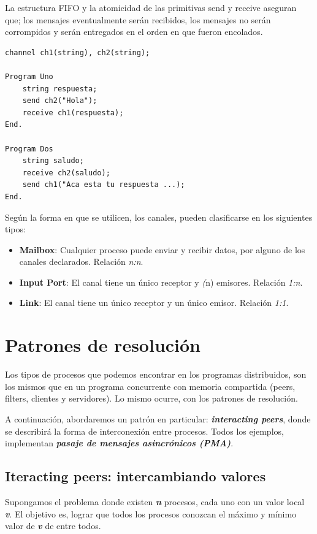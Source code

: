 \documentclass[a4paper, 10pt]{report}
\begin{document}
La estructura FIFO y la atomicidad de las primitivas send y receive aseguran que; los mensajes eventualmente serán recibidos, los mensajes no serán corrompidos y serán entregados en el orden en que fueron encolados.


\begin{lstlisting}[multicols=2]
channel ch1(string), ch2(string);

Program Uno
	string respuesta;
	send ch2("Hola");
	receive ch1(respuesta);
End.

Program Dos
	string saludo;
	receive ch2(saludo);
	send ch1("Aca esta tu respuesta ...);
End.
\end{lstlisting}

Según la forma en que se utilicen, los canales, pueden clasificarse en los siguientes tipos:

\begin{itemize}
	\item \textbf{Mailbox}: Cualquier proceso puede enviar y recibir datos, por alguno de los canales declarados. Relación \emph{n:n}.
	\item \textbf{Input Port}: El canal tiene un único receptor y \emph(n) emisores. Relación \emph{1:n}.
	\item \textbf{Link}: El canal tiene un único receptor y un único emisor. Relación \emph{1:1}.
\end{itemize}

\chapter{Patrones de resolución}

Los tipos de procesos que podemos encontrar en los programas distribuidos, son los mismos que en un programa concurrente con memoria compartida (peers, filters, clientes y servidores).
Lo mismo ocurre, con los patrones de resolución.

A continuación, abordaremos un patrón en particular: \textbf{\emph{interacting peers}}, donde se describirá la forma de interconexión entre procesos. Todos los ejemplos, implementan \textbf{\emph{pasaje de mensajes asincrónicos (PMA)}}.

\section{Iteracting peers: intercambiando valores}

Supongamos el problema donde existen \textbf{\emph{n}} procesos, cada uno con un valor local \textbf{\emph{v}}. El objetivo es, lograr que todos los procesos conozcan el máximo y mínimo valor de \textbf{\emph{v}} de entre todos.
\end{document}
